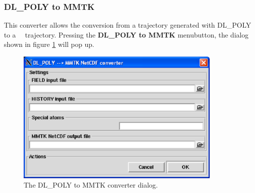 \documentclass[a4paper,11pt]{report}
\begin{document}
\subsubsection{DL\_POLY to MMTK}
\label{dlpoly_to_mmtk}
This converter allows the conversion from a trajectory generated with DL\_POLY \cite{DL_POLY} to a \MMTK\ \NetCDF\ 
trajectory. Pressing the \textbf{DL\_POLY to MMTK} menubutton, the dialog shown in figure \ref{fig:dlpoly_converter} will pop up.
\newpage
\begin{figure}[h!]
\begin{center}
\includegraphics[width=10cm]{Figures/dlpoly_converter.eps}
\end{center}
\caption[The DL\_POLY to MMTK converter dialog]{The DL\_POLY to MMTK converter dialog.}
\label{fig:dlpoly_converter}
\end{figure}   
\end{document}
